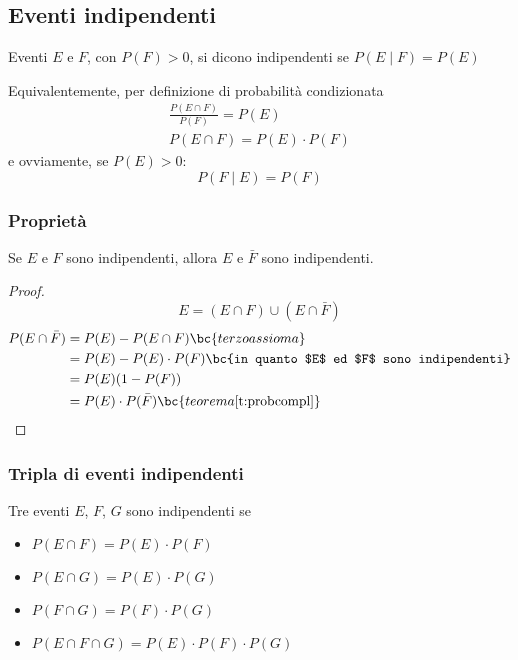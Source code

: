 \subsection{Eventi indipendenti}
\begin{defin}
	Eventi $E$ e $F$, con $P(F)>0$, si dicono indipendenti se $P(E \mid F)=P(E)$
\end{defin}

Equivalentemente, per definizione di probabilità condizionata
\begin{gather*}
	\frac{P(E \cap F)}{P(F)}=P(E) \\[1ex]
	P(E \cap F)=P(E)\cdot P(F)
\end{gather*}
e ovviamente, se $P(E)>0$:
\begin{equation*}
	P(F \mid E)=P(F)
\end{equation*}

\subsubsection{Proprietà}
\begin{teor}
	Se $E$ e $F$ sono indipendenti, allora $E$ e $\bar F$ sono indipendenti.
\end{teor}
\begin{proof}
	\begin{equation*}
		E = (E\cap F) \cup (E \cap \bar F)
	\end{equation*}
	\begin{align*}
		P(E \cap \bar F) & = P(E) - P(E \cap F)    \bc{terzo assioma}                          \\
		                 & = P(E) - P(E)\cdot P(F) \bc{in quanto $E$ ed $F$ sono indipendenti} \\
		                 & = P(E)(1-P(F))                                                      \\
		                 & = P(E)\cdot P(\bar F)   \bc{teorema \ref{t:probcompl}} \qedhere
	\end{align*}
\end{proof}

\subsubsection{Tripla di eventi indipendenti}
\begin{defin}
	Tre eventi $E$, $F$, $G$ sono indipendenti se
	\begin{itemize}
		\item $P(E \cap F)=P(E)\cdot P(F)$
		\item $P(E \cap G)=P(E)\cdot P(G)$
		\item $P(F \cap G)=P(F)\cdot P(G)$
		\item $P(E \cap F \cap G)=P(E)\cdot P(F)\cdot P(G)$
	\end{itemize}
\end{defin}


